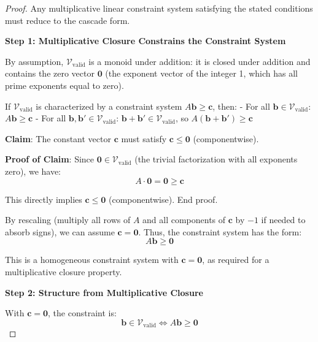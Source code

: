 \begin{proof}

Any multiplicative linear constraint system satisfying the stated conditions must reduce to the cascade form.

\noindent \textbf{Step 1: Multiplicative Closure Constrains the Constraint System}

By assumption, $\mathcal{V}_{\text{valid}}$ is a monoid under addition: it is closed under addition and contains the zero vector $\mathbf{0}$ (the exponent vector of the integer 1, which has all prime exponents equal to zero).

If $\mathcal{V}_{\text{valid}}$ is characterized by a constraint system $A\mathbf{b} \geq \mathbf{c}$, then:
- For all $\mathbf{b} \in \mathcal{V}_{\text{valid}}$: $A\mathbf{b} \geq \mathbf{c}$
- For all $\mathbf{b}, \mathbf{b}' \in \mathcal{V}_{\text{valid}}$: $\mathbf{b} + \mathbf{b}' \in \mathcal{V}_{\text{valid}}$, so $A(\mathbf{b} + \mathbf{b}') \geq \mathbf{c}$

\noindent \textbf{Claim}: The constant vector $\mathbf{c}$ must satisfy $\mathbf{c} \leq \mathbf{0}$ (componentwise).

\noindent \textbf{Proof of Claim}: Since $\mathbf{0} \in \mathcal{V}_{\text{valid}}$ (the trivial factorization with all exponents zero), we have:
\begin{equation}
A \cdot \mathbf{0} = \mathbf{0} \geq \mathbf{c}
\end{equation}

This directly implies $\mathbf{c} \leq \mathbf{0}$ (componentwise). End proof.

\noindent By rescaling (multiply all rows of $A$ and all components of $\mathbf{c}$ by $-1$ if needed to absorb signs), we can assume $\mathbf{c} = \mathbf{0}$. Thus, the constraint system has the form:
\begin{equation}
A\mathbf{b} \geq \mathbf{0}
\end{equation}

This is a homogeneous constraint system with $\mathbf{c} = \mathbf{0}$, as required for a multiplicative closure property.

\noindent \textbf{Step 2: Structure from Multiplicative Closure}

With $\mathbf{c} = \mathbf{0}$, the constraint is:
\begin{equation}
\mathbf{b} \in \mathcal{V}_{\text{valid}} \iff A\mathbf{b} \geq \mathbf{0}
\end{equation}


\end{proof}
